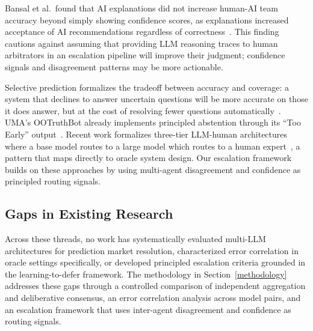 Bansal et al.\ found that AI explanations did not increase human-AI team accuracy beyond simply showing confidence scores, as explanations increased acceptance of AI recommendations regardless of correctness~\cite{bansal2021does}. This finding cautions against assuming that providing LLM reasoning traces to human arbitrators in an escalation pipeline will improve their judgment; confidence signals and disagreement patterns may be more actionable.

Selective prediction formalizes the tradeoff between accuracy and coverage: a system that declines to answer uncertain questions will be more accurate on those it does answer, but at the cost of resolving fewer questions automatically~\cite{chow1970optimum, geifman2017selective}. UMA's OOTruthBot already implements principled abstention through its ``Too Early'' output~\cite{uma2025truthbot}. Recent work formalizes three-tier LLM-human architectures where a base model routes to a large model which routes to a human expert~\cite{tiered2025architecture}, a pattern that maps directly to oracle system design. Our escalation framework builds on these approaches by using multi-agent disagreement and confidence as principled routing signals.


\subsection{Gaps in Existing Research}


Across these threads, no work has systematically evaluated multi-LLM
architectures for prediction market resolution, characterized error
correlation in oracle settings specifically, or developed principled
escalation criteria grounded in the learning-to-defer framework. The
methodology in Section~\ref{methodology} addresses these gaps through a controlled
comparison of independent aggregation and deliberative consensus, an
error correlation analysis across model pairs, and an escalation framework
that uses inter-agent disagreement and confidence as routing signals.